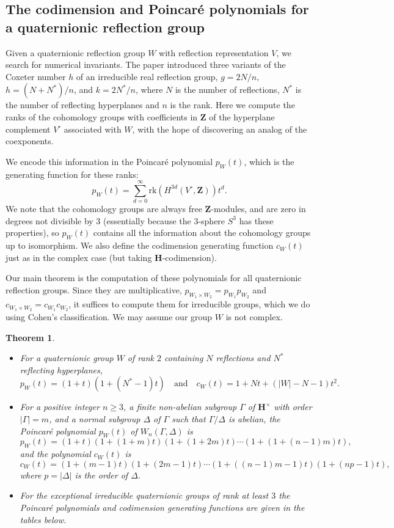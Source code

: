 \documentclass[11pt, reqno]{amsart}
\numberwithin{equation}{section}
\theoremstyle{definition}
\theoremstyle{plain}
\newtheorem{theorem}{Theorem}[section]
\newcommand{\HH}{\mathbf{H}}
\newcommand{\ZZ}{\mathbf{Z}}
\begin{document}
\subsection{The codimension and Poincar\'e polynomials for a quaternionic reflection group} Given a quaternionic reflection group $W$ with reflection representation $V$, we search for numerical invariants. The paper \cite{CaGr} introduced three variants of the Coxeter number $h$ of an irreducible real reflection group, $g=2N/n,$ $h=(N+N^*)/n$, and $k=2N^*/n$, where $N$ is the number of reflections, $N^*$ is the number of reflecting hyperplanes and $n$ is the rank. Here we compute the ranks of the cohomology groups with coefficients in $\ZZ$ of the  hyperplane complement $V^\circ$ associated with $W$, with the hope of discovering an analog of the coexponents. 

We encode this information in the Poincar\'e polynomial $p_W(t)$, which is the generating function for these ranks:
$$p_W(t)=\sum_{d=0}^\infty \mathrm{rk}\left(H^{3d}(V^\circ,\ZZ) \right) t^d.$$ We note that the cohomology groups are always free $\ZZ$-modules, and are zero in degrees not divisible by $3$ (essentially because the $3$-sphere $S^3$ has these properties), so $p_W(t)$ contains all the information about the cohomology groups up to isomorphism. We also define the codimension generating function $c_W(t)$ just as in the complex case (but taking $\HH$-codimension).

Our main theorem is the computation of these polynomials for all quaternionic reflection groups. Since they are multiplicative, $p_{W_1 \times W_2}=p_{W_1} p_{W_2}$ and $c_{W_1 \times W_2}=c_{W_1} c_{W_2}$, it suffices to compute them for irreducible groups, which we do using Cohen's \cite{Coh} classification. We may assume our group $W$ is not complex.

\newpage

\begin{theorem} \label{main theorem}

\begin{itemize} 
\item[(a)] For a quaternionic group $W$ of rank $2$ containing $N$ reflections and $N^*$ reflecting hyperplanes, $$p_W(t)=(1+t)(1+(N^*-1)t) \quad \text{and} \quad c_W(t)=1+Nt+(|W|-N-1)t^2.$$ 

\item[(b)] For a positive integer $n \geq 3$, a finite non-abelian subgroup $\Gamma$ of $\HH^\times$ with order $|\Gamma|=m$, and a normal subgroup $\Delta$ of $\Gamma$ such that $\Gamma/\Delta$ is abelian, the Poincar\'e polynomial $p_W(t)$ of $W_n(\Gamma,\Delta)$ is
$$p_W(t)=\left(1+t \right) \left(1+(1+m)t \right) \left(1+(1+2m)t \right)\cdots\left(1+(1+(n-1)m)t \right),$$ and the polynomial $c_W(t)$ is
$$c_W(t)=\left(1+(m-1)t \right)\left(1+(2m-1)t \right) \cdots \left(1+((n-1)m-1)t \right) \left(1+(n p-1)t \right),$$ where $p=|\Delta|$ is the order of $\Delta$. 
\item[(c)] For the exceptional irreducible quaternionic groups of rank at least $3$ the Poincar\'e polynomials and codimension generating functions are given in the tables below.
\end{itemize}
\end{theorem}
\end{document}
